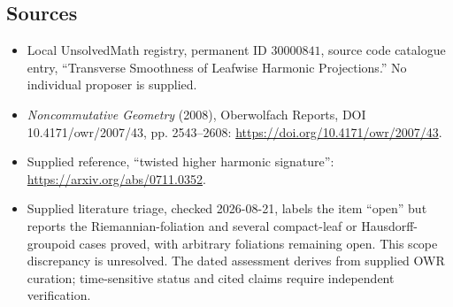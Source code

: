 \documentclass[11pt]{article}
\begin{document}
\subsection{Sources}
\begin{itemize}
\item Local UnsolvedMath registry, permanent ID \(30000841\), source code catalogue entry, ``Transverse Smoothness of Leafwise Harmonic Projections.'' No individual proposer is supplied.
\item \emph{Noncommutative Geometry} (2008), Oberwolfach Reports, DOI 10.4171/owr/2007/43, pp. 2543--2608: \url{https://doi.org/10.4171/owr/2007/43}.
\item Supplied reference, ``twisted higher harmonic signature'': \url{https://arxiv.org/abs/0711.0352}.
\item Supplied literature triage, checked 2026-08-21, labels the item ``open'' but reports the Riemannian-foliation and several compact-leaf or Hausdorff-groupoid cases proved, with arbitrary foliations remaining open. This scope discrepancy is unresolved. The dated assessment derives from supplied OWR curation; time-sensitive status and cited claims require independent verification.
\end{itemize}
\end{document}
